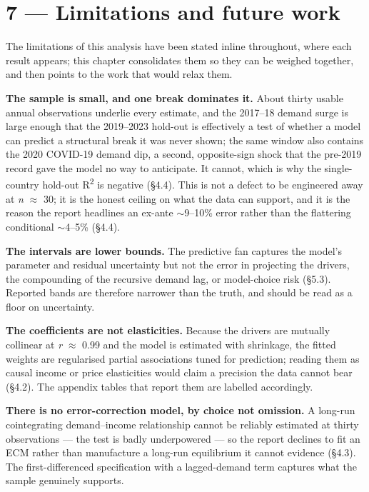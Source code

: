 \documentclass[10pt,twocolumn]{article}
\begin{document}
\section*{7 --- Limitations and future work}

The limitations of this analysis have been stated inline throughout, where each result appears; this chapter consolidates them so they can be weighed together, and then points to the work that would relax them.

\textbf{The sample is small, and one break dominates it.} About thirty usable annual observations underlie every estimate, and the 2017--18 demand surge is large enough that the 2019--2023 hold-out is effectively a test of whether a model can predict a structural break it was never shown; the same window also contains the 2020 COVID-19 demand dip, a second, opposite-sign shock that the pre-2019 record gave the model no way to anticipate. It cannot, which is why the single-country hold-out R\textsuperscript{2} is negative (\S{}4.4). This is not a defect to be engineered away at \textit{n} $\approx$ 30; it is the honest ceiling on what the data can support, and it is the reason the report headlines an ex-ante $\sim$9--10\% error rather than the flattering conditional $\sim$4--5\% (\S{}4.4).

\textbf{The intervals are lower bounds.} The predictive fan captures the model's parameter and residual uncertainty but not the error in projecting the drivers, the compounding of the recursive demand lag, or model-choice risk (\S{}5.3). Reported bands are therefore narrower than the truth, and should be read as a floor on uncertainty.

\textbf{The coefficients are not elasticities.} Because the drivers are mutually collinear at \textit{r} $\approx$ 0.99 and the model is estimated with shrinkage, the fitted weights are regularised partial associations tuned for prediction; reading them as causal income or price elasticities would claim a precision the data cannot bear (\S{}4.2). The appendix tables that report them are labelled accordingly.

\textbf{There is no error-correction model, by choice not omission.} A long-run cointegrating demand--income relationship cannot be reliably estimated at thirty observations --- the test is badly underpowered --- so the report declines to fit an ECM rather than manufacture a long-run equilibrium it cannot evidence (\S{}4.3). The first-differenced specification with a lagged-demand term captures what the sample genuinely supports.
\end{document}
